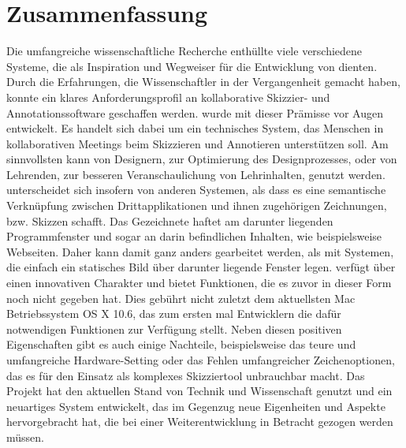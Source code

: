 \section*{Zusammenfassung}
Die umfangreiche wissenschaftliche Recherche enthüllte viele verschiedene Systeme, die als Inspiration und Wegweiser für die Entwicklung von \scribbler dienten. Durch die Erfahrungen, die Wissenschaftler in der Vergangenheit gemacht haben, konnte ein klares Anforderungsprofil an kollaborative Skizzier- und Annotationssoftware geschaffen werden. \scribbler wurde mit dieser Prämisse vor Augen entwickelt. Es handelt sich dabei um ein technisches System, das Menschen in kollaborativen Meetings beim Skizzieren und Annotieren unterstützen soll. Am sinnvollsten kann \scribbler von Designern, zur Optimierung des Designprozesses, oder von Lehrenden, zur besseren Veranschaulichung von Lehrinhalten, genutzt werden. \scribbler unterscheidet sich insofern von anderen Systemen, als dass es eine semantische Verknüpfung zwischen Drittapplikationen und ihnen zugehörigen Zeichnungen, bzw. Skizzen schafft. Das Gezeichnete haftet am darunter liegenden Programmfenster und sogar an darin befindlichen Inhalten, wie beispielsweise Webseiten. Daher kann damit ganz anders gearbeitet werden, als mit Systemen, die einfach ein statisches Bild über darunter liegende Fenster legen. \scribbler verfügt über einen innovativen Charakter und bietet Funktionen, die es zuvor in dieser Form noch nicht gegeben hat. Dies gebührt nicht zuletzt dem aktuellsten Mac Betriebssystem OS X 10.6, das zum ersten mal Entwicklern die dafür notwendigen Funktionen zur Verfügung stellt. Neben diesen positiven Eigenschaften gibt es auch einige Nachteile, beispielsweise das teure und umfangreiche Hardware-Setting oder das Fehlen umfangreicher Zeichenoptionen, das es für den Einsatz als komplexes Skizziertool unbrauchbar macht. Das Projekt \scribbler hat den aktuellen Stand von Technik und Wissenschaft genutzt und ein neuartiges System entwickelt, das im Gegenzug neue Eigenheiten und Aspekte hervorgebracht hat, die bei einer Weiterentwicklung in Betracht gezogen werden müssen. 